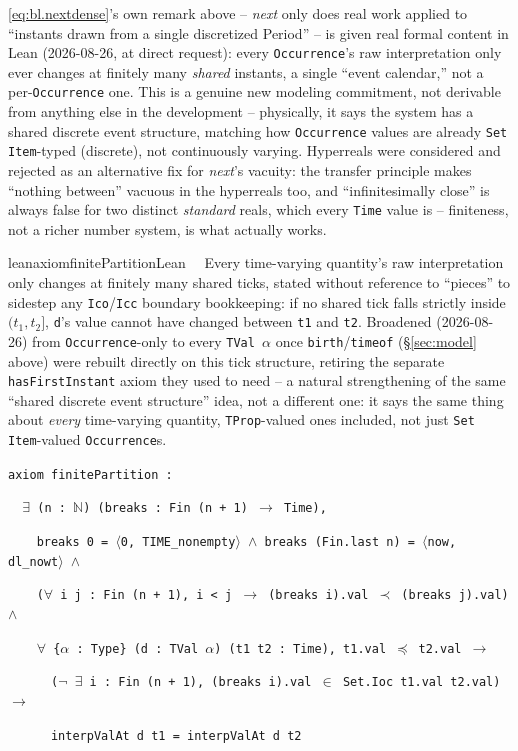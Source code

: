 \pn \eqref{eq:bl.nextdense}'s own remark above -- \textit{next} only does real work applied to ``instants drawn
from a single discretized Period'' -- is given real formal content in Lean (2026-08-26, at direct
request): every \texttt{Occurrence}'s raw interpretation only ever changes at finitely many \emph{shared}
instants, a single ``event calendar,'' not a per-\texttt{Occurrence} one. This is a genuine new modeling
commitment, not derivable from anything else in the development -- physically, it says the system has a
shared discrete event structure, matching how \texttt{Occurrence} values are already \texttt{Set Item}-typed
(discrete), not continuously varying. Hyperreals were considered and rejected as an alternative fix for
\textit{next}'s vacuity: the transfer principle makes ``nothing between'' vacuous in the hyperreals too, and
``infinitesimally close'' is always false for two distinct \emph{standard} reals, which every \texttt{Time}
value is -- finiteness, not a richer number system, is what actually works.

\begin{restatable}{leanaxiom}{finitePartitionLean}~~ Every time-varying
quantity's raw interpretation only changes at finitely many shared ticks, stated without reference to
``pieces'' to sidestep any \texttt{Ico}/\texttt{Icc} boundary bookkeeping: if no shared tick falls strictly
inside $(t_1,t_2]$, \texttt{d}'s value cannot have changed between \texttt{t1} and \texttt{t2}. Broadened
(2026-08-26) from \texttt{Occurrence}-only to every \texttt{TVal $\alpha$} once \texttt{birth}/\texttt{timeof}
(\S\ref{sec:model} above) were rebuilt directly on this tick structure, retiring the separate
\texttt{hasFirstInstant} axiom they used to need -- a natural strengthening of the same ``shared discrete
event structure'' idea, not a different one: it says the same thing about \emph{every} time-varying
quantity, \texttt{TProp}-valued ones included, not just \texttt{Set Item}-valued \texttt{Occurrence}s.

\texttt{\textcolor{leancolor}{axiom} \textcolor{leanyellow}{finitePartition} :}

\texttt{~~$\exists$ (n : $\mathbb{N}$) (breaks : Fin (n + 1) $\to$ Time),}

\texttt{~~~~breaks 0 = $\langle$0, TIME\_nonempty$\rangle$ $\wedge$ breaks (Fin.last n) = $\langle$now, dl\_nowt$\rangle$ $\wedge$}

\texttt{~~~~($\forall$ i j : Fin (n + 1), i < j $\to$ (breaks i).val $\prec$ (breaks j).val) $\wedge$}

\texttt{~~~~$\forall$ \{$\alpha$ : Type\} (d : TVal $\alpha$) (t1 t2 : Time), t1.val $\preccurlyeq$ t2.val $\to$}

\texttt{~~~~~~($\lnot$ $\exists$ i : Fin (n + 1), (breaks i).val $\in$ Set.Ioc t1.val t2.val) $\to$}

\texttt{~~~~~~interpValAt d t1 = interpValAt d t2}
\label{finitePartition}
\end{restatable}

